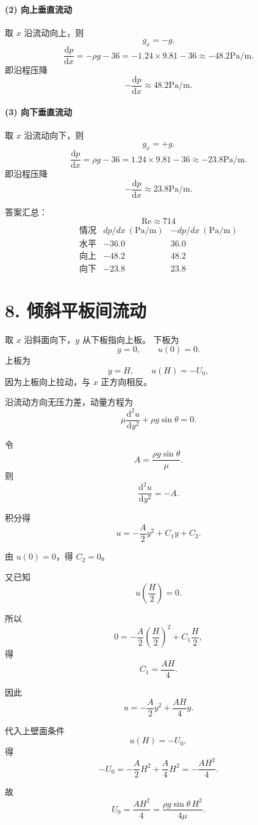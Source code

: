 ﻿\documentclass[12pt,a4paper]{ctexart}
\newcommand{\Rey}{\mathrm{Re}}
\newcommand{\dd}{\mathrm d}
\begin{document}
\paragraph{(2) 向上垂直流动}
取 \(x\) 沿流动向上，则
\[
g_x=-g.
\]
\[
\frac{\dd p}{\dd x}
=-\rho g-36
=-1.24\times9.81-36
\approx-48.2\mathrm{Pa/m}.
\]
即沿程压降
\[
-\frac{\dd p}{\dd x}\approx48.2\mathrm{Pa/m}.
\]

\paragraph{(3) 向下垂直流动}
取 \(x\) 沿流动向下，则
\[
g_x=+g.
\]
\[
\frac{\dd p}{\dd x}
=\rho g-36
=1.24\times9.81-36
\approx-23.8\mathrm{Pa/m}.
\]
即沿程压降
\[
-\frac{\dd p}{\dd x}\approx23.8\mathrm{Pa/m}.
\]

答案汇总：
\[
\boxed{
\Rey\approx714
}
\]
\[
\boxed{
\begin{array}{c|c|c}
\text{情况} & dp/dx\ (\mathrm{Pa/m}) & -dp/dx\ (\mathrm{Pa/m})\\
\hline
\text{水平} & -36.0 & 36.0\\
\text{向上} & -48.2 & 48.2\\
\text{向下} & -23.8 & 23.8
\end{array}
}
\]

\section*{8. 倾斜平板间流动}

取 \(x\) 沿斜面向下，\(y\) 从下板指向上板。
下板为
\[
y=0,\qquad u(0)=0.
\]
上板为
\[
y=H,\qquad u(H)=-U_0,
\]
因为上板向上拉动，与 \(x\) 正方向相反。

沿流动方向无压力差，动量方程为
\[
\mu\frac{\dd^2u}{\dd y^2}+\rho g\sin\theta=0.
\]

令
\[
A=\frac{\rho g\sin\theta}{\mu}.
\]
则
\[
\frac{\dd^2u}{\dd y^2}=-A.
\]

积分得
\[
u=-\frac A2y^2+C_1y+C_2.
\]

由 \(u(0)=0\)，得 \(C_2=0\)。

又已知
\[
u\left(\frac H2\right)=0.
\]

所以
\[
0=-\frac A2\left(\frac H2\right)^2+C_1\frac H2,
\]
得
\[
C_1=\frac{AH}{4}.
\]

因此
\[
u=-\frac A2y^2+\frac{AH}{4}y.
\]

代入上壁面条件
\[
u(H)=-U_0,
\]
得
\[
-U_0=-\frac A2H^2+\frac A4H^2=-\frac{AH^2}{4}.
\]

故
\[
U_0=\frac{AH^2}{4}
=\frac{\rho g\sin\theta\,H^2}{4\mu}.
\]
\end{document}
